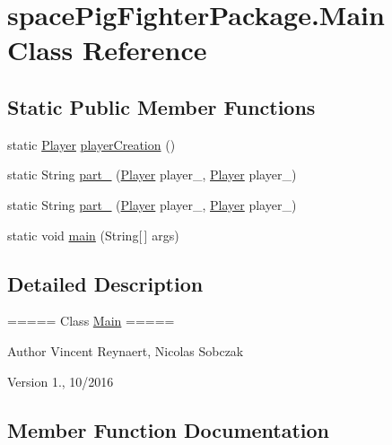 \hypertarget{classspace_pig_fighter_package_1_1_main}{}\section{space\+Pig\+Fighter\+Package.\+Main Class Reference}
\label{classspace_pig_fighter_package_1_1_main}
\subsection*{Static Public Member Functions}
\begin{DoxyCompactItemize}
\item 
static \hyperlink{classplayer_package_1_1_player}{Player} \hyperlink{classspace_pig_fighter_package_1_1_main_a8db9557406db889675ae060fb9c15c50}{player\+Creation} ()
\item 
static String \hyperlink{classspace_pig_fighter_package_1_1_main_a51384377791f5184a8d67188008d9007}{part\+\_} (\hyperlink{classplayer_package_1_1_player}{Player} player\+\_, \hyperlink{classplayer_package_1_1_player}{Player} player\+\_)
\item 
static String \hyperlink{classspace_pig_fighter_package_1_1_main_a486c5dee27254957f78a4900d318b883}{part\+\_} (\hyperlink{classplayer_package_1_1_player}{Player} player\+\_, \hyperlink{classplayer_package_1_1_player}{Player} player\+\_)
\item 
static void \hyperlink{classspace_pig_fighter_package_1_1_main_aa08fce3143ed981c78dd68d54db056a8}{main} (String\mbox{[}$\,$\mbox{]} args)
\end{DoxyCompactItemize}


\subsection{Detailed Description}
===== Class \hyperlink{classspace_pig_fighter_package_1_1_main}{Main} =====

\begin{DoxyAuthor}{Author}
Vincent Reynaert, Nicolas Sobczak 
\end{DoxyAuthor}
\begin{DoxyVersion}{Version}
1., 10/2016 
\end{DoxyVersion}


\subsection{Member Function Documentation}
